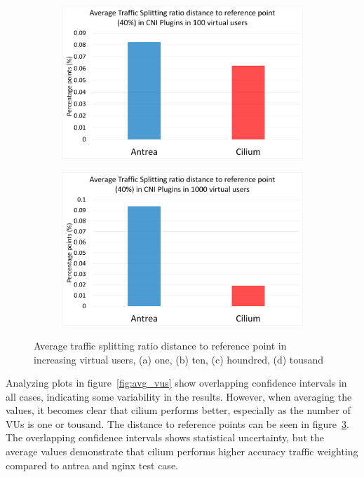 \begin{figure}[H]
    \begin{subfigure}[b]{0.48\textwidth}
        \includegraphics[width=\textwidth]{plots/traffic-splitting/time_window_5_100vu_reference_cloud.png}
        \label{fig:reference_100vu}
        \caption{}
    \end{subfigure}
    \begin{subfigure}[b]{0.48\textwidth}
        \includegraphics[width=\textwidth]{plots/traffic-splitting/time_window_5_1000vu_reference_cloud.png}
        \label{fig:reference_1000vu}
        \caption{}
    \end{subfigure}

    \caption{Average traffic splitting ratio distance to reference point in increasing virtual users, (a) one, (b) ten, (c) houndred, (d) tousand }
    \label{fig:referencesIngress}
\end{figure}

Analyzing plots in figure~\ref{fig:avg_vus} show overlapping confidence intervals in all cases, indicating some variability in the results. However, when averaging the values, it becomes clear that cilium performs better, especially as the number of VUs is one or tousand. The distance to reference points can be seen in figure~\ref{fig:referencesIngress}. The overlapping confidence intervals shows statistical uncertainty, but the average values demonstrate that cilium performs higher accuracy traffic weighting compared to antrea and nginx test case.
